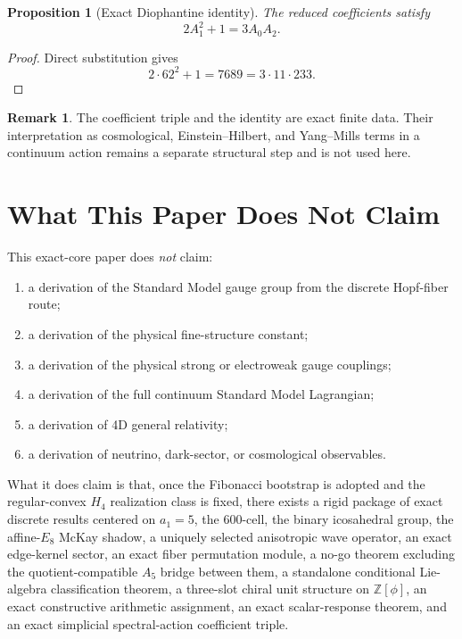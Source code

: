 \documentclass[12pt,a4paper]{article}
\newtheorem{proposition}{Proposition}
\theoremstyle{definition}
\newtheorem{remark}{Remark}
\begin{document}
\begin{proposition}[Exact Diophantine identity]
\label{prop:dioph_exact}
The reduced coefficients satisfy
\begin{equation}
2A_1^2+1=3A_0A_2.
\end{equation}
\end{proposition}

\begin{proof}
Direct substitution gives
\[
2\cdot 62^2+1=7689=3\cdot 11\cdot 233.
\]
\end{proof}

\begin{remark}
The coefficient triple and the identity are exact finite data.  Their interpretation as cosmological, Einstein--Hilbert, and Yang--Mills terms in a continuum action remains a separate structural step and is not used here.
\end{remark}

\section{What This Paper Does Not Claim}

This exact-core paper does \emph{not} claim:
\begin{enumerate}
\item a derivation of the Standard Model gauge group from the discrete Hopf-fiber route;
\item a derivation of the physical fine-structure constant;
\item a derivation of the physical strong or electroweak gauge couplings;
\item a derivation of the full continuum Standard Model Lagrangian;
\item a derivation of 4D general relativity;
\item a derivation of neutrino, dark-sector, or cosmological observables.
\end{enumerate}

What it does claim is that, once the Fibonacci bootstrap is adopted and the regular-convex $H_4$ realization class is fixed, there exists a rigid package of exact discrete results centered on $a_1=5$, the 600-cell, the binary icosahedral group, the affine-$E_8$ McKay shadow, a uniquely selected anisotropic wave operator, an exact edge-kernel sector, an exact fiber permutation module, a no-go theorem excluding the quotient-compatible $A_5$ bridge between them, a standalone conditional Lie-algebra classification theorem, a three-slot chiral unit structure on $\mathbb{Z}[\phi]$, an exact constructive arithmetic assignment, an exact scalar-response theorem, and an exact simplicial spectral-action coefficient triple.
\end{document}
